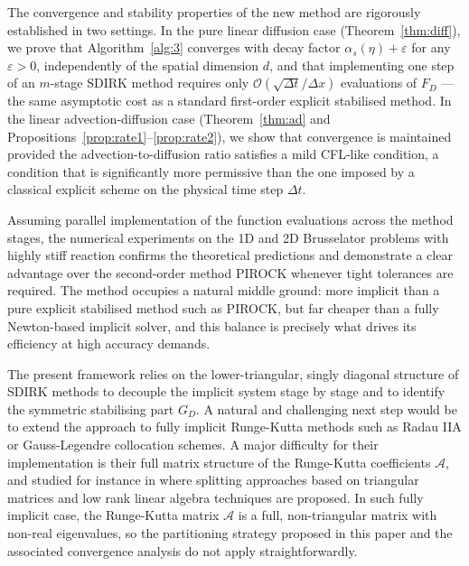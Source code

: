 \documentclass[10pt,a4paper]{article}
\def \calA{\mathcal{A}}
\begin{document}
The convergence and stability properties of the new method are rigorously established in
two settings. In the pure linear diffusion case (Theorem~\ref{thm:diff}), we prove that
Algorithm~\ref{alg:3} converges with {decay factor} $\alpha_s(\eta)+\varepsilon$ for any
$\varepsilon>0$, independently of the spatial dimension $d$, and that implementing one
step of an $m$-stage SDIRK method requires only
$\mathcal{O}(\sqrt{\Delta t}/\Delta x)$ evaluations of $F_D$ — the same asymptotic cost
as a standard first-order explicit stabilised method. In the linear advection-diffusion
case (Theorem~\ref{thm:ad} and Propositions~\ref{prop:rate1}--\ref{prop:rate2}), we show
that convergence is maintained provided the advection-to-diffusion ratio satisfies a
mild CFL-like condition, a condition that is significantly
more permissive than the one imposed by a classical explicit scheme on the physical time
step $\Delta t$.

Assuming parallel implementation of the function evaluations across the method stages,
the numerical experiments on the 1D and 2D Brusselator problems with {highly stiff
reaction  confirms} the theoretical predictions and demonstrate a clear
advantage over the second-order method PIROCK \cite{AV13} whenever tight tolerances are
required. The method occupies a natural middle ground: more implicit than a pure explicit
stabilised method such as PIROCK, but far cheaper than a fully Newton-based implicit
solver, and this balance is precisely what drives its efficiency at high accuracy demands.

The present framework relies on the lower-triangular, singly diagonal structure of SDIRK
methods to decouple the implicit system stage by stage and to identify the symmetric
stabilising part $G_D$. A natural and challenging next step would be to extend the approach to
fully implicit Runge-Kutta methods such as Radau IIA or Gauss-Legendre collocation
schemes. 
{A major difficulty for their implementation is their full matrix structure of the Runge-Kutta coefficients $\calA$, and studied for instance in \cite{IM98,BIM15} where splitting approaches based on  triangular matrices and low rank linear algebra techniques are proposed. 
In such fully implicit case,} the
Runge-Kutta matrix $\calA$ is a full, non-triangular matrix with non-real eigenvalues,
so the partitioning strategy proposed in this paper and the associated convergence analysis do not apply straightforwardly.
\end{document}
